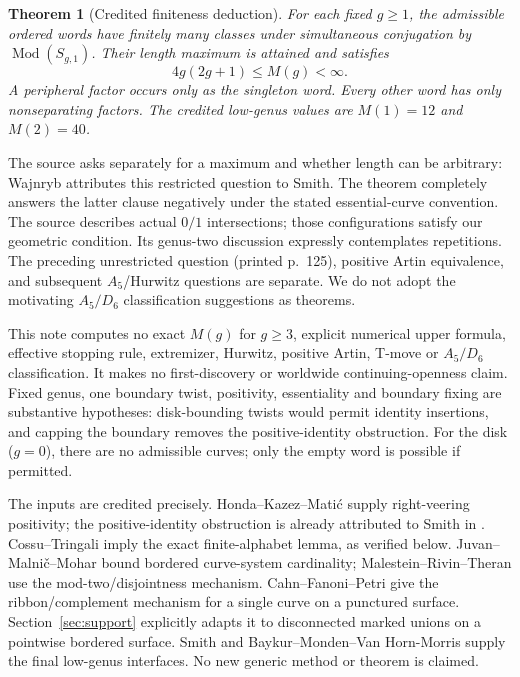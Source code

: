 \documentclass[11pt]{article}
\newtheorem{theorem}{Theorem}
\newcommand{\Mod}{\operatorname{Mod}}
\begin{document}
\begin{theorem}[Credited finiteness deduction]\label{thm:main}
For each fixed $g\geq1$, the admissible ordered words have finitely many classes under simultaneous conjugation by $\Mod(S_{g,1})$. Their length maximum is attained and satisfies
\[
4g(2g+1)\leq M(g)<\infty.
\]
A peripheral factor occurs only as the singleton word. Every other word has only nonseparating factors. The credited low-genus values are $M(1)=12$ and $M(2)=40$.
\end{theorem}

The source asks separately for a maximum and whether length can be arbitrary: Wajnryb \cite[printed p.~126, PDF p.~133]{W} attributes this restricted question to Smith. The theorem completely answers the latter clause negatively under the stated essential-curve convention. The source describes actual $0/1$ intersections; those configurations satisfy our geometric condition. Its genus-two discussion expressly contemplates repetitions. The preceding unrestricted question (printed p.~125), positive Artin equivalence, and subsequent $A_5$/Hurwitz questions are separate. We do not adopt the motivating $A_5/D_6$ classification suggestions as theorems.

This note computes no exact $M(g)$ for $g\geq3$, explicit numerical upper formula, effective stopping rule, extremizer, Hurwitz, positive Artin, T-move or $A_5/D_6$ classification. It makes no first-discovery or worldwide continuing-openness claim. Fixed genus, one boundary twist, positivity, essentiality and boundary fixing are substantive hypotheses: disk-bounding twists would permit identity insertions, and capping the boundary removes the positive-identity obstruction. For the disk ($g=0$), there are no admissible curves; only the empty word is possible if permitted.

The inputs are credited precisely. Honda--Kazez--Mati\'c \cite{HKM} supply right-veering positivity; the positive-identity obstruction is already attributed to Smith in \cite[printed p.~124]{W}. Cossu--Tringali \cite[Corollary 4.13]{CT} imply the exact finite-alphabet lemma, as verified below. Juvan--Malni\v c--Mohar \cite[Theorem 3.3]{JMM} bound bordered curve-system cardinality; Malestein--Rivin--Theran \cite[Proposition 4.1 and Section 6]{MRT} use the mod-two/disjointness mechanism. Cahn--Fanoni--Petri \cite[Lemma 10 and Section 3.2]{CFP} give the ribbon/complement mechanism for a single curve on a punctured surface. Section~\ref{sec:support} explicitly adapts it to disconnected marked unions on a pointwise bordered surface. Smith \cite{S} and Baykur--Monden--Van Horn-Morris \cite{BMVHM} supply the final low-genus interfaces. No new generic method or theorem is claimed.
\end{document}
